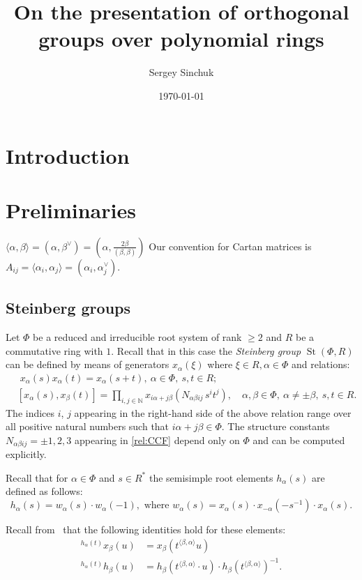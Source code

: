 \documentclass[oneside, 10pt]{amsart}
\title{On the presentation of orthogonal groups over polynomial rings}
\author {Sergey Sinchuk}
\date {\today}
\theoremstyle{remark}
\theoremstyle{definition}
\DeclareMathOperator{\St}{St}
\numberwithin{equation}{section}
\begin{document}
\maketitle
\section{Introduction}


\section{Preliminaries}
$\langle \alpha, \beta \rangle = (\alpha, \beta^\vee) = (\alpha, \frac{2\beta}{(\beta, \beta)})$
Our convention for Cartan matrices is 
$A_{ij} = \langle \alpha_i, \alpha_j \rangle = (\alpha_i, \alpha_j^\vee)$.

\subsection{Steinberg groups}
Let $\Phi$ be a reduced and irreducible root system of rank $\geq 2$ and $R$ be a commutative ring with $1$. Recall that in this case the \emph{Steinberg group} $\St(\Phi, R)$ can be defined by means of generators $x_{\alpha}(\xi)$ where $\xi\in R, \alpha\in\Phi$ and relations:
\begin{align}
& \phantom{[}
x_\alpha(s) x_\alpha(t) = x_\alpha(s+t),\ \alpha\in\Phi,\ s,t\in R; \label{rel:add}\\
& [x_\alpha(s), x_\beta(t)] = \prod\limits_{i,j\in\mathbb{N}}
 x_{i\alpha + j\beta}\left(N_{\alpha\beta ij}\, s^i t^j\right),\quad \alpha,\beta\in\Phi,\ \alpha\neq\pm\beta,\ s,t\in R. \label{rel:CCF}
\end{align}
The indices $i$, $j$ appearing in the right-hand side of the above relation range over
all positive natural numbers such that $i\alpha + j\beta\in\Phi$.
The structure constants $N_{\alpha \beta i j}=\pm 1,2,3$ appearing in \eqref{rel:CCF} depend only on $\Phi$ and can be computed explicitly.

Recall that for $\alpha\in\Phi$ and $s \in R^*$ the semisimple root elements $h_\alpha(s)$ are defined as follows: \[h_\alpha(s)=w_\alpha(s) \cdot w_\alpha(-1), \text{ where } w_\alpha(s) = x_\alpha(s) \cdot x_{-\alpha}(-s^{-1}) \cdot x_\alpha(s).\]

Recall from~\cite[Lemma~5.2]{Ma69} that the following identities hold for these elements:
 \begin{align} 
   \label{eq:conj-h-x} {}^{h_\alpha(t)}\!x_\beta(u) & = x_\beta(t^{\langle \beta,  \alpha \rangle}u) \\
   \label{eq:conj-h-h} {}^{h_\alpha(t)}\!h_\beta(u) & = h_\beta(t^{\langle \beta, \alpha \rangle} \cdot u) \cdot h_\beta(t^{\langle \beta,  \alpha \rangle})^{-1}.
 \end{align}
\end{document}
